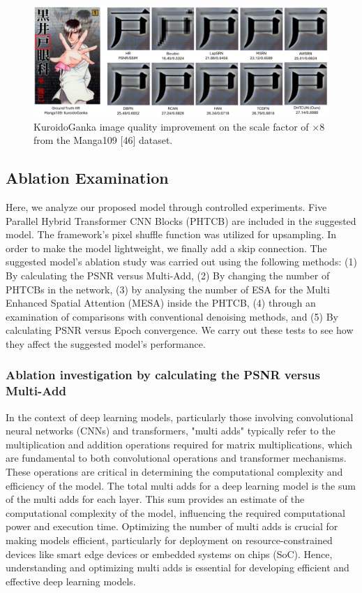 \documentclass{ieeeaccess}
\begin{document}
\begin{figure}
    \centering

    \includegraphics[width=\linewidth]{19Figure.pdf}
    \caption{KuroidoGanka image quality improvement on the scale factor of $\times8$ from the Manga109 [46] dataset.}
    \label{fig:19}
\end{figure}

\subsection{Ablation Examination}
Here, we analyze our proposed model through controlled experiments. Five Parallel Hybrid Transformer CNN Blocks (PHTCB) are included in the suggested model. The framework's pixel shuffle function was utilized for upsampling. In order to make the model lightweight, we finally add a skip connection. The suggested model's ablation study was carried out using the following methods: (1) By calculating the PSNR versus Multi-Add, (2) By changing the number of PHTCBs in the network, (3) by analysing the number of ESA for the Multi Enhanced Spatial Attention (MESA) inside the PHTCB, (4) through an examination of comparisons with conventional denoising methods, and (5) By calculating PSNR versus Epoch convergence. We carry out these tests to see how they affect the suggested model's performance. 

\subsubsection{Ablation investigation by calculating the PSNR versus Multi-Add}

In the context of deep learning models, particularly those involving convolutional neural networks (CNNs) and transformers, "multi adds" typically refer to the multiplication and addition operations required for matrix multiplications, which are fundamental to both convolutional operations and transformer mechanisms. These operations are critical in determining the computational complexity and efficiency of the model. The total multi adds for a deep learning model is the sum of the multi adds for each layer. This sum provides an estimate of the computational complexity of the model, influencing the required computational power and execution time. Optimizing the number of multi adds is crucial for making models efficient, particularly for deployment on resource-constrained devices like smart edge devices or embedded systems on chips (SoC). Hence, understanding and optimizing multi adds is essential for developing efficient and effective deep learning models.
\end{document}
